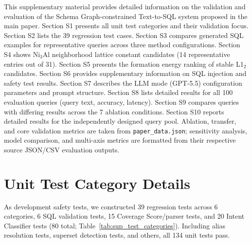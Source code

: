 \documentclass{npj-compt.mater}
\begin{document}
\noindent
This supplementary material provides detailed information on
the validation and evaluation of the Schema Graph-constrained
Text-to-SQL system proposed in the main paper.
Section S1 presents all unit test categories and their validation
focus.
Section S2 lists the 39 regression test cases.
Section S3 compares generated SQL examples for representative
queries across three method configurations.
Section S4 shows Ni$_3$Al neighborhood lattice constant candidates
(14 representative entries out of 31).
Section S5 presents the formation energy ranking of stable L1$_2$
candidates.
Section S6 provides supplementary information on SQL injection and
safety test results.
Section S7 describes the LLM mode (GPT-5.5) configuration
parameters and prompt structure.
Section S8 lists detailed results for all 100 evaluation queries
(query text, accuracy, latency).
Section S9 compares queries with differing results across the 7
ablation conditions.
Section S10 reports detailed results for the independently designed
query pool.
Ablation, transfer, and core validation metrics are taken from
\texttt{paper\_data.json}; sensitivity analysis, model comparison,
and multi-axis metrics are formatted from their respective source
JSON/CSV evaluation outputs.

\section{Unit Test Category Details}
\label{sec:sup_test_categories}

As development safety tests, we constructed 39 regression tests
across 6 categories, 6 SQL validation tests, 15 Coverage
Score/parser tests, and 20 Intent Classifier tests (80 total;
Table~\ref{tab:sup_test_categories}).
Including alias resolution tests, superset detection tests, and
others, all 134 unit tests pass.
\end{document}
